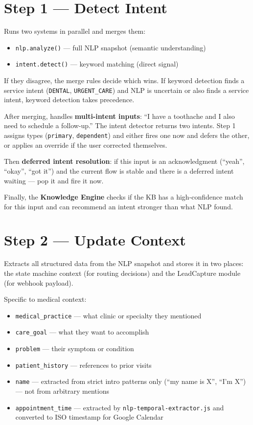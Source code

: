 \documentclass[12pt, a4paper]{report}
\newcommand{\ic}[1]{\texttt{\small\color{accentblue!70!black}#1}}
\begin{document}
\section{Step 1 --- Detect Intent}

Runs two systems in parallel and merges them:
\begin{itemize}
  \item \ic{nlp.analyze()} --- full NLP snapshot (semantic understanding)
  \item \ic{intent.detect()} --- keyword matching (direct signal)
\end{itemize}

If they disagree, the merge rules decide which wins. If keyword detection finds a service
intent (\ic{DENTAL}, \ic{URGENT\_CARE}) and NLP is uncertain or also finds a service
intent, keyword detection takes precedence.

After merging, handles \textbf{multi-intent inputs}: ``I have a toothache and I also
need to schedule a follow-up.'' The intent detector returns two intents. Step 1 assigns
types (\ic{primary}, \ic{dependent}) and either fires one now and defers the other, or
applies an override if the user corrected themselves.

Then \textbf{deferred intent resolution}: if this input is an acknowledgment (``yeah'',
``okay'', ``got it'') and the current flow is stable and there is a deferred intent
waiting --- pop it and fire it now.

Finally, the \textbf{Knowledge Engine} checks if the KB has a high-confidence match for
this input and can recommend an intent stronger than what NLP found.

\section{Step 2 --- Update Context}

Extracts all structured data from the NLP snapshot and stores it in two places: the
state machine context (for routing decisions) and the LeadCapture module (for webhook
payload).

Specific to medical context:
\begin{itemize}
  \item \ic{medical\_practice} --- what clinic or specialty they mentioned
  \item \ic{care\_goal} --- what they want to accomplish
  \item \ic{problem} --- their symptom or condition
  \item \ic{patient\_history} --- references to prior visits
  \item \ic{name} --- extracted from strict intro patterns only
        (``my name is X'', ``I'm X'') --- not from arbitrary mentions
  \item \ic{appointment\_time} --- extracted by \ic{nlp-temporal-extractor.js}
        and converted to ISO timestamp for Google Calendar
\end{itemize}
\end{document}
